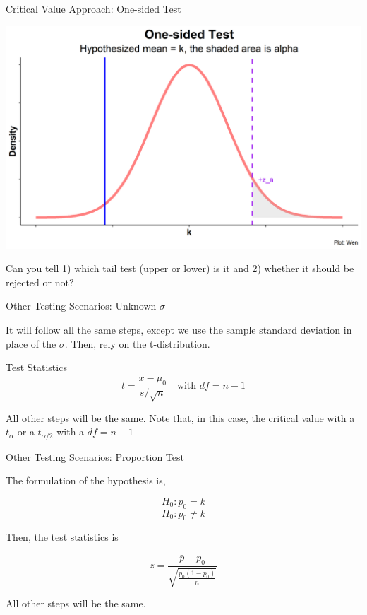 \documentclass{beamer}
\begin{document}
\begin{frame}{Critical Value Approach: One-sided Test}

\begin{center}
\includegraphics[scale=0.5]{images/HypothesisTestingOneSided.png}
\end{center}

Can you tell 1) which tail test (upper or lower) is it and 2) whether it should be rejected or not? 

\end{frame}



\begin{frame}{Other Testing Scenarios: Unknown $\sigma$}

It will follow all the same steps, except we use the sample standard deviation in place of the $\sigma$. Then, rely on the t-distribution. 

\vspace{0.3 cm}
Test Statistics
\vspace{0.2 cm}
$$ t = \frac{\bar{x}-\mu_0}{s/\sqrt{n}} \quad \text{with } df = n-1  $$

\vspace{0.3 cm}
All other steps will be the same. Note that, in this case, the critical value with a $t_{\alpha} $ or a  $t_{\alpha/2} $ with a $df =  n - 1$

\end{frame}


\begin{frame}{Other Testing Scenarios: Proportion Test}

The formulation of the hypothesis is, 

$$ H_0: p_0 = k $$
$$ H_0: p_0 \neq k $$

Then, the test statistics is 

$$ z = \frac{\bar{p}-p_0}{\sqrt{\frac{p_0(1-p_0)}{n}}} $$

All other steps will be the same. 

\end{frame}
\end{document}
